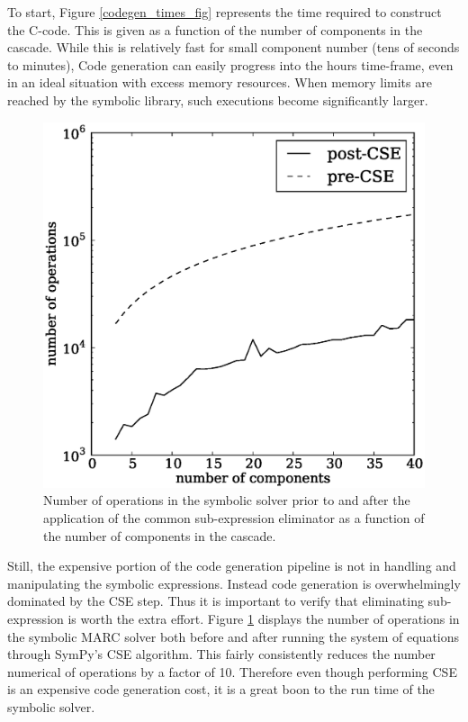 \documentclass[preprint,12pt]{elsarticle}
\begin{document}
To start, Figure \ref{codegen_times_fig} represents the time required to construct 
the C-code.  This is given as a function of the number of components in the cascade.
While this is relatively fast for small component number (tens of seconds to minutes),
Code generation can easily progress into the hours time-frame, even in an ideal 
situation with excess memory resources.  When memory limits are reached by the 
symbolic library, such executions become significantly larger.

\begin{figure}[htpb]
\begin{center}
\includegraphics[scale=0.5]{numops.eps}
\caption{Number of operations in the symbolic solver prior to and after the 
    application of the common sub-expression eliminator as a function of the
    number of components in the cascade.}
\label{numops_fig}
\end{center}
\end{figure}

Still, the expensive portion of the code generation pipeline is not in handling 
and manipulating the symbolic expressions.  Instead code generation is overwhelmingly
dominated by the CSE step.  Thus it is important to verify that eliminating
sub-expression is worth the extra effort.  Figure \ref{numops_fig} displays the
number of operations in the symbolic MARC solver both before and after running the 
system of equations through SymPy's CSE algorithm.  This fairly consistently reduces
the number numerical of operations by a factor of 10.   Therefore even though
performing CSE is an expensive code generation cost, it is a great boon to the 
run time of the symbolic solver.
\end{document}
